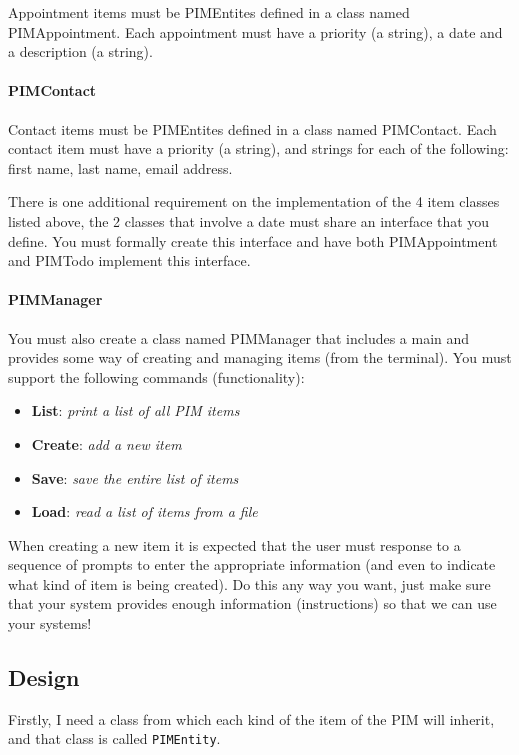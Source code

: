 \documentclass{article}
\begin{document}
Appointment items must be PIMEntites defined in a class named PIMAppointment. Each appointment must have a priority (a string),
a date and a description (a string).

\paragraph{PIMContact}

Contact items must be PIMEntites defined in a class named PIMContact. Each contact item must have a priority (a string), and strings for each of the following: first name, last name, email address.

There is one additional requirement on the implementation of the 4 item classes listed above, the 2 classes that involve a date must share an interface that you define. You must formally create this interface and have both PIMAppointment and PIMTodo implement this interface.

\paragraph{PIMManager}

You must also create a class named PIMManager that includes a main and provides some way of creating and managing items (from the terminal). You must support the following commands (functionality):

\begin{itemize}
\item \textbf{List}: \textit{print a list of all PIM items}
\item \textbf{Create}: \textit{add a new item}
\item \textbf{Save}: \textit{save the entire list of items}
\item \textbf{Load}: \textit{read a list of items from a file}
\end{itemize}

When creating a new item it is expected that the user must response to a sequence of prompts to enter the appropriate information
(and even to indicate what kind of item is being created). Do this any way you want, just make sure that your system provides enough
information (instructions) so that we can use your systems!

\subsection{Design}
\label{sec:pim:design}

Firstly, I need a class from which each kind of the item of the PIM will inherit, and that class is called
\lstinline|PIMEntity|.
\end{document}
